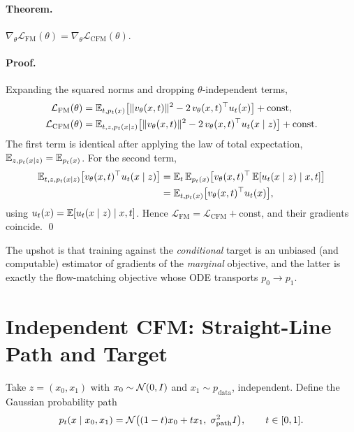 \paragraph{Theorem.} $\nabla_\theta \mathcal{L}_{\text{FM}}(\theta) = \nabla_\theta \mathcal{L}_{\text{CFM}}(\theta)$.

\paragraph{Proof.} Expanding the squared norms and dropping $\theta$-independent terms,
\begin{align*}
  \mathcal{L}_{\text{FM}}(\theta) &= \mathbb{E}_{t, p_t(x)}\bigl[\|v_\theta(x, t)\|^2 - 2\,v_\theta(x, t)^{\top}u_t(x)\bigr] + \text{const},\\
  \mathcal{L}_{\text{CFM}}(\theta) &= \mathbb{E}_{t, z, p_t(x\mid z)}\bigl[\|v_\theta(x, t)\|^2 - 2\,v_\theta(x, t)^{\top}u_t(x\mid z)\bigr] + \text{const}.
\end{align*}
The first term is identical after applying the law of total expectation, $\mathbb{E}_{z, p_t(x\mid z)} = \mathbb{E}_{p_t(x)}$. For the second term,
\begin{align*}
  \mathbb{E}_{t, z, p_t(x \mid z)}\bigl[v_\theta(x, t)^{\top}u_t(x \mid z)\bigr] &= \mathbb{E}_{t}\,\mathbb{E}_{p_t(x)}\bigl[v_\theta(x, t)^{\top}\,\mathbb{E}[u_t(x \mid z) \mid x, t]\bigr]\\
  &= \mathbb{E}_{t, p_t(x)}\bigl[v_\theta(x, t)^{\top}u_t(x)\bigr],
\end{align*}
using $u_t(x) = \mathbb{E}[u_t(x \mid z) \mid x, t]$. Hence $\mathcal{L}_{\text{FM}} = \mathcal{L}_{\text{CFM}} + \text{const}$, and their gradients coincide. \qed

The upshot is that training against the \emph{conditional} target is an unbiased (and computable) estimator of gradients of the \emph{marginal} objective, and the latter is exactly the flow-matching objective whose ODE transports $p_0 \to p_1$.

\section{Independent CFM: Straight-Line Path and Target}
\label{app:icfm}

Take $z = (x_0, x_1)$ with $x_0 \sim \mathcal{N}(0, I)$ and $x_1 \sim p_{\text{data}}$, independent. Define the Gaussian probability path
\begin{equation*}
  p_t(x \mid x_0, x_1) = \mathcal{N}\bigl((1 - t)x_0 + t x_1,\; \sigma_{\text{path}}^2 I\bigr),
  \qquad t \in [0, 1].
\end{equation*}

